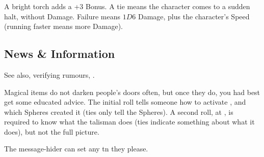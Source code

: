 \begin{multicols}{2}
\subsubsection{}

\subsubsection{}

\subsubsection{}

%
A bright torch adds a +3 Bonus.
A tie means the character comes to a sudden halt, without Damage.
Failure means $1D6$ Damage, plus the character's Speed (running faster means more Damage).

\subsubsection{}

\subsection{News \& Information}

See also, verifying rumours, .

Magical items do not darken people's doors often, but once they do, you had best get some educated advice.
The initial roll tells someone how to activate , and which Spheres created it (ties only tell the Spheres).
A second roll, at \tn[14], is required to know what the \gls{talisman} does (ties indicate something about what it does), but not the full picture.


The message-hider can set any \gls{tn} they please.


\end{multicols}
